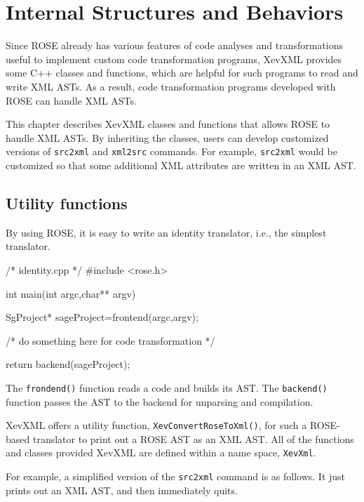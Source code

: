 \chapter{Internal Structures and Behaviors}\label{chap:internal}

Since ROSE already has various features of code analyses and
transformations useful to implement custom code transformation programs,
XevXML provides some C++ classes and functions, which are helpful for
such programs to read and write XML ASTs.  As a result, code
transformation programs developed with ROSE can handle XML ASTs.

This chapter describes XevXML classes and functions that allows ROSE to
handle XML ASTs. By inheriting the classes, users can develop customized
versions of \texttt{src2xml} and \texttt{xml2src} commands. For example,
\texttt{src2xml} would be customized so that some additional XML
attributes are written in an XML AST.


\section{Utility functions}

By using ROSE, it is easy to write an identity translator, i.e., the
simplest translator.
\begin{framed}
\begin{src}
/* identity.cpp */
#include <rose.h>

int main(int argc,char** argv){
  SgProject* sageProject=frontend(argc,argv);

  /* do something here for code transformation */

  return backend(sageProject);
}
\end{src}
\end{framed}

The \texttt{frondend()} function reads a code and builds its AST. The
\texttt{backend()} function passes the AST to the backend for unparsing
and compilation.

XevXML offers a utility function, \texttt{XevConvertRoseToXml()}, for
such a ROSE-based translator to print out a ROSE AST as an XML AST. All
of the functions and classes provided XevXML are defined within a name
space, \texttt{XevXml}.


For example, a simplified version of the \texttt{src2xml} command is as
follows. It just prints out an XML AST, and then immediately quits.

